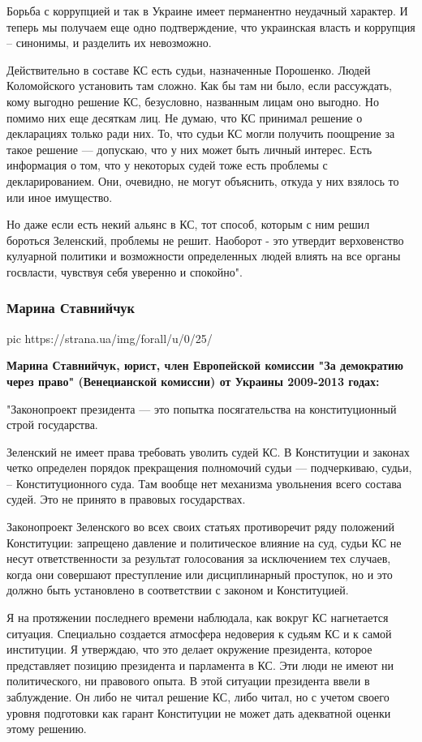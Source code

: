 Борьба с коррупцией и так в Украине имеет перманентно неудачный характер. И
теперь мы получаем еще одно подтверждение, что украинская власть и коррупция –
синонимы, и разделить их невозможно.

Действительно в составе КС есть судьи, назначенные Порошенко. Людей
Коломойского установить там сложно. Как бы там ни было, если рассуждать, кому
выгодно решение КС, безусловно, названным лицам оно выгодно. Но помимо них еще
десяткам лиц. Не думаю, что КС принимал решение о декларациях только ради них.
То, что судьи КС могли получить поощрение за такое решение --- допускаю, что у
них может быть личный интерес. Есть информация о том, что у некоторых судей
тоже есть проблемы с декларированием. Они, очевидно, не могут объяснить, откуда
у них взялось то или иное имущество.

Но даже если есть некий альянс в КС, тот способ, которым с ним решил бороться
Зеленский, проблемы не решит. Наоборот - это утвердит верховенство кулуарной
политики и возможности определенных людей влиять на все органы госвласти,
чувствуя себя уверенно и спокойно". 

\subsubsection{Марина Ставнийчук}

\ifcmt
	pic https://strana.ua/img/forall/u/0/25/%
\fi

\textbf{Марина Ставнийчук, юрист, член Европейской комиссии "За демократию через право"
(Венецианской комиссии) от Украины 2009-2013 годах:}

"Законопроект президента --- это попытка посягательства на конституционный строй государства. 

Зеленский не имеет права требовать уволить судей КС. В Конституции и законах
четко определен порядок прекращения полномочий судьи --- подчеркиваю, судьи, –
Конституционного суда. Там вообще нет механизма увольнения всего состава судей.
Это не принято в правовых государствах.

Законопроект Зеленского во всех своих статьях противоречит ряду положений
Конституции: запрещено давление и политическое влияние на суд, судьи КС не
несут ответственности за результат голосования за исключением тех случаев,
когда они совершают преступление или дисциплинарный проступок, но и это должно
быть установлено в соответствии с законом и Конституцией.

Я на протяжении последнего времени наблюдала, как вокруг КС нагнетается
ситуация. Специально создается атмосфера недоверия к судьям КС и к самой
институции. Я утверждаю, что это делает окружение президента, которое
представляет позицию президента и парламента в КС. Эти люди не имеют ни
политического, ни правового опыта. В этой ситуации президента ввели в
заблуждение. Он либо не читал решение КС, либо читал, но с учетом своего уровня
подготовки как гарант Конституции не может дать адекватной оценки этому
решению.

